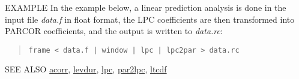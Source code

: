 \begin{options}
\end{options}

\begin{qsection}{EXAMPLE}
In the example below, a linear prediction analysis is
done in the input file {\em data.f} in float format,
the LPC coefficients are then transformed into PARCOR coefficients,
and the output is written to {\em data.rc}:
\begin{quote}
 \verb!frame < data.f | window | lpc | lpc2par > data.rc!
\end{quote} 
\end{qsection}

\begin{qsection}{SEE ALSO}
\hyperlink{acorr}{acorr},
\hyperlink{levdur}{levdur},
\hyperlink{lpc}{lpc},
\hyperlink{par2lpc}{par2lpc},
\hyperlink{ltcdf}{ltcdf}
\end{qsection}
